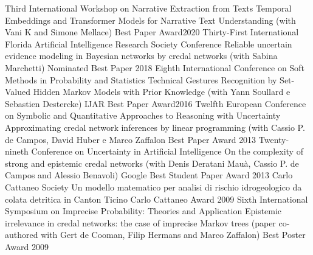 \begin{cvhonors}
\cvhonor
{Third International Workshop on Narrative Extraction from Texts}
{Temporal Embeddings and Transformer Models for Narrative Text Understanding (with Vani K and Simone Mellace)}
{Best Paper Award}{2020}
\cvhonor 
{Thirty-First International Florida Artificial Intelligence Research Society Conference}
{Reliable uncertain evidence modeling in Bayesian networks by credal networks (with Sabina Marchetti)}
{Nominated Best Paper}
{2018}
\cvhonor 
{Eighth International Conference on Soft Methods in Probability and Statistics}
{Technical Gestures Recognition by Set-Valued Hidden Markov Models with Prior Knowledge (with Yann Soullard e Sebastien Destercke)}
{IJAR Best Paper Award}{2016}
\cvhonor
{Twelfth European Conference on Symbolic and Quantitative Approaches to Reasoning with Uncertainty}
{Approximating credal network inferences by linear programming (with Cassio P. de Campos, David Huber e Marco Zaffalon}
{Best Paper Award}
{2013}
\cvhonor
{Twenty-nineth Conference on Uncertainty in Artificial Intelligence}
{On the complexity of strong and epistemic credal networks
(with Denis Deratani Mau\`a, Cassio P. de Campos and Alessio Benavoli)}
{Google Best Student Paper Award}
{2013}
\cvhonor
{Carlo Cattaneo Society}
{Un modello matematico per analisi di rischio idrogeologico da colata detritica in Canton Ticino}
{Carlo Cattaneo Award}
{2009}
\cvhonor
{Sixth International Symposium on Imprecise Probability: Theories and Application}
{Epistemic irrelevance in credal networks: the case of imprecise Markov trees (paper co-authored with Gert de Cooman, Filip Hermans and Marco Zaffalon)}
{Best Poster Award}
{2009}
\end{cvhonors}